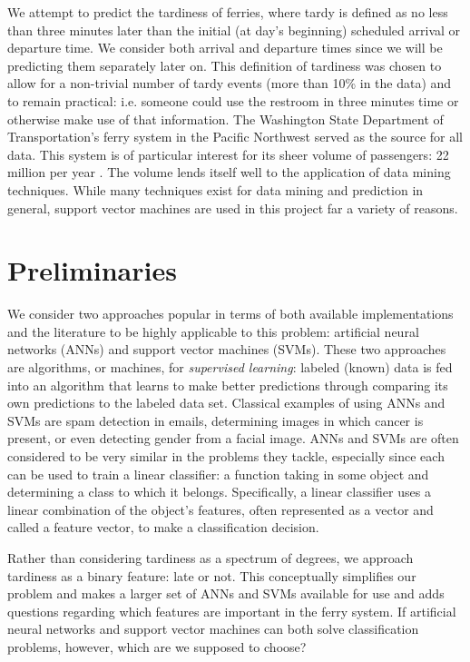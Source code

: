 \documentclass[11pt]{article} %
\begin{document}
We attempt to predict the tardiness of ferries, where tardy is 
defined as no less than three minutes later than the initial (at day's beginning) 
scheduled arrival or departure time. We consider both arrival and departure 
times since we will be predicting them separately later on. This definition
of tardiness was chosen to allow for a non-trivial number of tardy events 
(more than 10\% in the data) and to remain practical: i.e. someone could use the
restroom in three minutes time or otherwise make use of that information. The 
Washington State Department of Transportation's ferry system in the Pacific
Northwest served as the source for all data. This system is of 
particular interest for its sheer volume of passengers: 22 million per year 
\cite{wsfTraffic}.  The volume lends itself well to the application of 
data mining techniques. While many techniques exist for data mining and 
prediction in general, support vector machines are used in this project far a 
variety of reasons.


\section{Preliminaries}
\label{sec:prelims}
We consider two approaches popular in terms of both available implementations and 
the literature to be highly applicable to this problem:
artificial neural networks (ANNs) and support vector machines (SVMs). These two 
approaches are algorithms, or machines, for
\textit{supervised learning}: labeled (known) data is fed into an
algorithm that learns to make better predictions through comparing its own 
predictions to the labeled data set. Classical examples of using ANNs and SVMs are
spam detection in emails, determining images in which cancer is present, or even
detecting gender from a facial image. ANNs and SVMs are often considered to be
very similar in the problems they tackle, especially since each can
be used to train a linear classifier: a function taking in some object and 
determining a class to which it belongs. Specifically, a linear classifier uses
a linear combination of the object's features, often represented as a vector and
called a feature vector, to make a classification decision.

Rather than considering tardiness as a 
spectrum of degrees, we approach tardiness as a binary feature: late or not. This 
conceptually simplifies our problem and makes a larger set of ANNs and SVMs 
available for use and adds questions regarding which features are important in 
the ferry system. 
If artificial neural networks and support vector machines 
can both solve classification problems, however, which are we supposed to choose?
\end{document}
